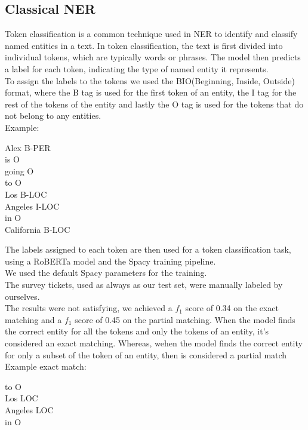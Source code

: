 \subsection{Classical NER}
\label{sec:classical_ner}
Token classification is a common technique used in NER to identify and classify named entities in a text. In token classification, the text is first divided into individual tokens, which are typically words or phrases. The model then predicts a label for each token, indicating the type of named entity it represents.\\
To assign the labels to the tokens we used the BIO(Beginning, Inside, Outside) format, where the B tag is used for the first token of an entity, the I tag for the rest of the tokens of the entity and lastly the O tag is used for the tokens that do not belong to any entities. \\
Example:
\begin{adjustwidth}{1cm}{}
    Alex B-PER\\
    is O\\
    going O\\
    to O\\
    Los B-LOC\\
    Angeles I-LOC\\
    in O\\
    California B-LOC
\end{adjustwidth}
The labels assigned to each token are then used for a token classification task, using a RoBERTa model and the Spacy training pipeline. \\
We used the default Spacy parameters for the training. \\
The survey tickets, used as always as our test set, were manually labeled by ourselves. \\
The results were not satisfying, we achieved a $f_1$ score of 0.34 on the exact matching and a $f_1$ score of 0.45 on the partial matching. When the model finds the correct entity for all the tokens and only the tokens of an entity, it's considered an exact matching. Whereas, wehen the model finds the correct entity for only a subset of the token of an entity, then is considered a partial match\\
Example exact match:
\begin{adjustwidth}{1cm}{}
    to O\\
    Los LOC\\
    Angeles LOC\\
    in O\\
\end{adjustwidth}
